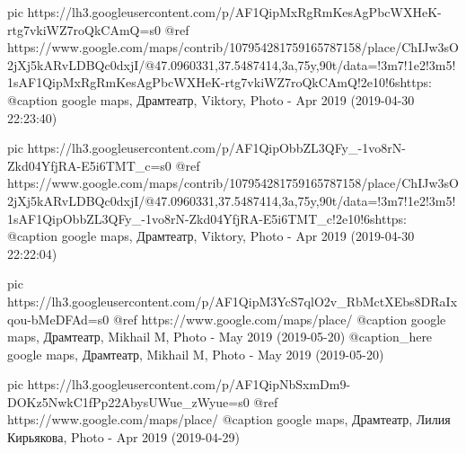
     pic https://lh3.googleusercontent.com/p/AF1QipMxRgRmKesAgPbcWXHeK-rtg7vkiWZ7roQkCAmQ=s0
     @ref https://www.google.com/maps/contrib/107954281759165787158/place/ChIJw3sO2jXj5kARvLDBQc0dxjI/@47.0960331,37.5487414,3a,75y,90t/data=!3m7!1e2!3m5!1sAF1QipMxRgRmKesAgPbcWXHeK-rtg7vkiWZ7roQkCAmQ!2e10!6shttps:%
     @caption google maps, Драмтеатр, Viktory, Photo - Apr 2019 (2019-04-30 22:23:40)

     pic https://lh3.googleusercontent.com/p/AF1QipObbZL3QFy_-1vo8rN-Zkd04YfjRA-E5i6TMT_c=s0
     @ref https://www.google.com/maps/contrib/107954281759165787158/place/ChIJw3sO2jXj5kARvLDBQc0dxjI/@47.0960331,37.5487414,3a,75y,90t/data=!3m7!1e2!3m5!1sAF1QipObbZL3QFy_-1vo8rN-Zkd04YfjRA-E5i6TMT_c!2e10!6shttps:%
     @caption google maps, Драмтеатр, Viktory, Photo - Apr 2019 (2019-04-30 22:22:04)

     pic https://lh3.googleusercontent.com/p/AF1QipM3YcS7qlO2v_RbMctXEbs8DRaIxqou-bMeDFAd=s0
     @ref https://www.google.com/maps/place/%
     @caption google maps, Драмтеатр, Mikhail M, Photo - May 2019 (2019-05-20)
     @caption_here google maps, Драмтеатр, Mikhail M, Photo - May 2019 (2019-05-20)

     pic https://lh3.googleusercontent.com/p/AF1QipNbSxmDm9-DOKz5NwkC1fPp22AbysUWue_zWyue=s0
     @ref https://www.google.com/maps/place/%
     @caption google maps, Драмтеатр, Лилия Кирьякова, Photo - Apr 2019 (2019-04-29)

